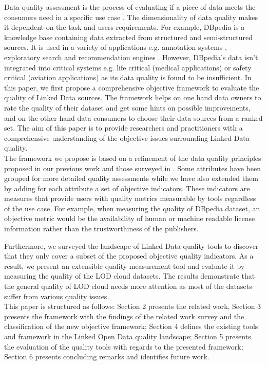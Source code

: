 \documentclass[onecolumn, crcready]{iosart2c}
\begin{document}
Data quality assessment is the process of evaluating if a piece of data meets the consumers need in a specific use case \cite{Bizer:2009:QIF:1482178.1482280}. The dimensionality of data quality makes it dependent on the task and users requirements. For example, DBpedia \cite{bizer_dbpedia_2009} is a knowledge base containing data extracted from structured and semi-structured sources. It is used in a variety of applications  e.g. annotation systems \cite{Mendes:2011:DSS:2063518.2063519}, exploratory search \cite{Marie:2013:DHO:2506182.2506185} and recommendation engines \cite{conf/iir/MirizziNROS12}. However, DBpedia's data isn't integrated into critical systems e.g. life critical (medical applications) or safety critical (aviation applications) as its data quality is found to be insufficient. In this paper, we first propose a comprehensive objective framework to evaluate the quality of Linked Data sources. The framework helps on one hand data owners to rate the quality of their dataset and get some hints on possible improvements, and on the other hand data consumers to choose their data sources from a ranked set. The aim of this paper is to provide researchers and practitioners with a comprehensive understanding of the objective issues surrounding Linked Data quality.\\

The framework we propose is based on a refinement of the data quality principles proposed in our previous work \cite{assaf2012} and those surveyed in \cite{Framework2012}. Some attributes have been grouped for more detailed quality assessments while we have also extended them by adding for each attribute a set of objective indicators. These indicators are measures that provide users with quality metrics measurable by tools regardless of the use case. For example, when measuring the quality of DBpedia dataset, an objective metric would be the availability of human or machine readable license information rather than the trustworthiness of the publishers.

Furthermore, we surveyed the landscape of Linked Data quality tools to discover that they only cover a subset of the proposed objective quality indicators. As a result, we present an extensible quality measurement tool and evaluate it by measuring the quality of the LOD cloud datasets. The results demonstrate that the general quality of LOD cloud needs more attention as most of the datasets suffer from various quality issues.\\

This paper is structured as follows: Section 2 presents the related work, Section 3 presents the framework with the findings of the related work survey and the classification of the new objective framework; Section 4 defines the existing tools and framework in the Linked Open Data quality landscape; Section 5 presents the evaluation of the quality tools with regards to the presented framework; Section 6 presents concluding remarks and identifies future work.
\end{document}
